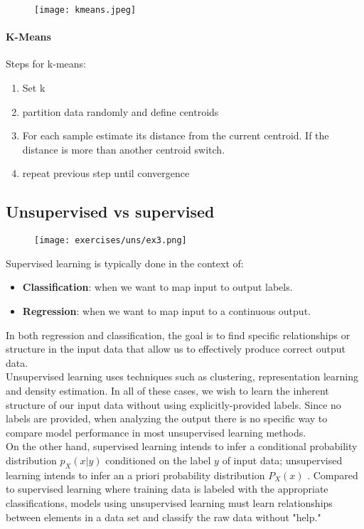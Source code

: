 \begin{figure}[H]
    \centering
    \texttt{[image: kmeans.jpeg]}
\end{figure}

\paragraph{K-Means}
Steps for k-means:
\begin{enumerate}
\item Set k
\item partition data randomly and define centroids
\item For each sample estimate its distance from the current centroid. If the distance is more than another centroid switch.
\item repeat previous step until convergence
\end{enumerate}


\subsection{Unsupervised vs supervised}
\begin{figure}[H]
    \centering
    \texttt{[image: exercises/uns/ex3.png]}
\end{figure}

Supervised learning is typically done in the context of:
\begin{itemize}
\item \textbf{Classification}: when we want to map input to output labels.
\item \textbf{Regression}: when we want to map input to a continuous output.
\end{itemize} 

In both regression and classification, the goal is to find specific relationships or structure in the input data that allow us to effectively produce correct output data.\\

Unsupervised learning uses techniques such as clustering, representation learning and density estimation. In all of these cases, we wish to learn the inherent structure of our input data without using explicitly-provided labels. Since no labels are provided, when analyzing the output there is no specific way to compare model performance in most unsupervised learning methods.\\
 
On the other hand, supervised learning  intends to infer a conditional probability distribution $p_X(x|y)$ conditioned on the label $y$ of input data; unsupervised learning intends to infer an a priori probability distribution $P_X(x)$ . Compared to supervised learning where training data is labeled with the appropriate classifications, models using unsupervised learning must learn relationships between elements in a data set and classify the raw data without "help."



